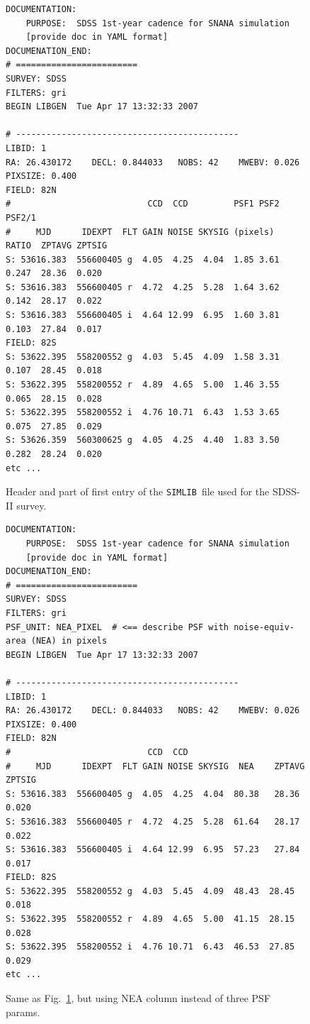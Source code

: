 \documentclass[12pt]{article}
\newcommand{\simlib}{{\tt SIMLIB}}
\begin{document}
{\begin{figure} [ht] 
\begin{center}
\begin{Verbatim}[frame=single]
DOCUMENTATION:
    PURPOSE:  SDSS 1st-year cadence for SNANA simulation
    [provide doc in YAML format]
DOCUMENATION_END:
# ========================
SURVEY: SDSS     
FILTERS: gri 
BEGIN LIBGEN  Tue Apr 17 13:32:33 2007
 
# -------------------------------------------- 
LIBID: 1 
RA: 26.430172    DECL: 0.844033   NOBS: 42    MWEBV: 0.026   PIXSIZE: 0.400 
FIELD: 82N
#                           CCD  CCD         PSF1 PSF2 PSF2/1                    
#     MJD      IDEXPT  FLT GAIN NOISE SKYSIG (pixels)  RATIO  ZPTAVG ZPTSIG
S: 53616.383  556600405 g  4.05  4.25  4.04  1.85 3.61 0.247  28.36  0.020 
S: 53616.383  556600405 r  4.72  4.25  5.28  1.64 3.62 0.142  28.17  0.022 
S: 53616.383  556600405 i  4.64 12.99  6.95  1.60 3.81 0.103  27.84  0.017 
FIELD: 82S
S: 53622.395  558200552 g  4.03  5.45  4.09  1.58 3.31 0.107  28.45  0.018 
S: 53622.395  558200552 r  4.89  4.65  5.00  1.46 3.55 0.065  28.15  0.028 
S: 53622.395  558200552 i  4.76 10.71  6.43  1.53 3.65 0.075  27.85  0.029 
S: 53626.359  560300625 g  4.05  4.25  4.40  1.83 3.50 0.282  28.24  0.020 
etc ...
\end{Verbatim}
\end{center}
\caption{
  Header and part of first entry of the \simlib\ file used for
  the SDSS-II survey.
 }
\label{fig:simlib}
\end{figure}


\begin{figure} [ht] 
\begin{center}
\begin{Verbatim}[frame=single]
DOCUMENTATION:
    PURPOSE:  SDSS 1st-year cadence for SNANA simulation
    [provide doc in YAML format]
DOCUMENATION_END:
# ========================
SURVEY: SDSS     
FILTERS: gri 
PSF_UNIT: NEA_PIXEL  # <== describe PSF with noise-equiv-area (NEA) in pixels
BEGIN LIBGEN  Tue Apr 17 13:32:33 2007
 
# -------------------------------------------- 
LIBID: 1 
RA: 26.430172    DECL: 0.844033   NOBS: 42    MWEBV: 0.026   PIXSIZE: 0.400 
FIELD: 82N
#                           CCD  CCD        
#     MJD      IDEXPT  FLT GAIN NOISE SKYSIG  NEA    ZPTAVG ZPTSIG
S: 53616.383  556600405 g  4.05  4.25  4.04  80.38   28.36  0.020 
S: 53616.383  556600405 r  4.72  4.25  5.28  61.64   28.17  0.022 
S: 53616.383  556600405 i  4.64 12.99  6.95  57.23   27.84  0.017 
FIELD: 82S
S: 53622.395  558200552 g  4.03  5.45  4.09  48.43  28.45  0.018 
S: 53622.395  558200552 r  4.89  4.65  5.00  41.15  28.15  0.028 
S: 53622.395  558200552 i  4.76 10.71  6.43  46.53  27.85  0.029 
etc ...
\end{Verbatim}
\end{center}
\caption{
  Same as Fig.~\ref{fig:simlib}, but using NEA column instead of
  three PSF params.
 }
\label{fig:simlib_nea}
\end{figure}



}
\end{document}
